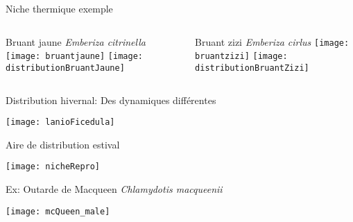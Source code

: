 \documentclass[]{beamer}
\begin{document}
\begin{frame}{Niche thermique exemple}
  \begin{columns}[c]
    \begin{column}[c]{0.5\textwidth}
      \begin{center}
        Bruant jaune \textit{Emberiza citrinella}
        \vspace{10pt}
        \texttt{[image: bruantjaune]}
        \vspace{5pt}
        \texttt{[image: distributionBruantJaune]}   
      \end{center}
    \end{column}
    \begin{column}[c]{0.5\textwidth}
      
      \begin{center}
        Bruant zizi \textit{Emberiza cirlus}
        \vspace{10pt}
        \texttt{[image: bruantzizi]}
        \vspace{5pt}
        \texttt{[image: distributionBruantZizi]}   
      \end{center}
    \end{column}
  \end{columns}
\end{frame}

\begin{frame}{Distribution hivernal: Des dynamiques différentes}
  \begin{center}
    \texttt{[image: lanioFicedula]}
  \end{center}
\end{frame}

\begin{frame}{Aire de distribution estival}
  \begin{center}
    \texttt{[image: nicheRepro]}
  \end{center}
\end{frame}


\begin{frame}{Ex: Outarde de Macqueen \textit{Chlamydotis macqueenii}}
  \begin{center}
    \texttt{[image: mcQueen\_male]}
  \end{center}
\end{frame}
\end{document}
